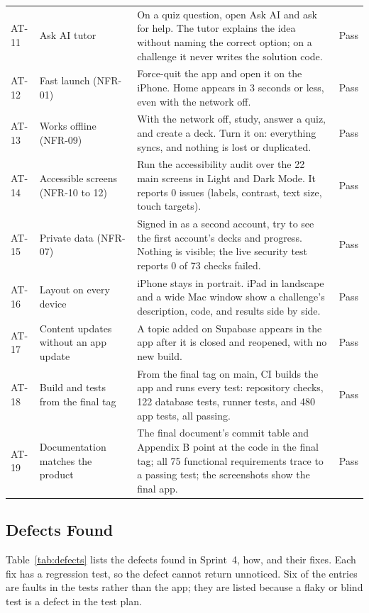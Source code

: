 \documentclass[12pt,letterpaper]{article}
\begin{document}
\begin{xltabular}{\textwidth}{@{}L{1.0cm} L{3.0cm} Y L{2.0cm}@{}}
AT-11 & Ask AI tutor & On a quiz question, open Ask AI and ask for help. The tutor explains the idea without naming the correct option; on a challenge it never writes the solution code. & Pass \\
AT-12 & Fast launch (NFR-01) & Force-quit the app and open it on the iPhone. Home appears in 3 seconds or less, even with the network off. & Pass \\
AT-13 & Works offline (NFR-09) & With the network off, study, answer a quiz, and create a deck. Turn it on: everything syncs, and nothing is lost or duplicated. & Pass \\
AT-14 & Accessible screens (NFR-10 to 12) & Run the accessibility audit over the 22 main screens in Light and Dark Mode. It reports 0 issues (labels, contrast, text size, touch targets). & Pass \\
AT-15 & Private data (NFR-07) & Signed in as a second account, try to see the first account's decks and progress. Nothing is visible; the live security test reports 0 of 73 checks failed. & Pass \\
AT-16 & Layout on every device & iPhone stays in portrait. iPad in landscape and a wide Mac window show a challenge's description, code, and results side by side. & Pass \\
AT-17 & Content updates without an app update & A topic added on Supabase appears in the app after it is closed and reopened, with no new build. & Pass \\
AT-18 & Build and tests from the final tag & From the final tag on main, CI builds the app and runs every test: repository checks, 122 database tests, runner tests, and 480 app tests, all passing. & Pass \\
AT-19 & Documentation matches the product & The final document's commit table and Appendix B point at the code in the final tag; all 75 functional requirements trace to a passing test; the screenshots show the final app. & Pass \\
\end{xltabular}

\subsection{Defects Found}\label{sec:defects}
Table~\ref{tab:defects} lists the defects found in Sprint~4, how, and their fixes.
Each fix has a regression test, so the defect cannot return unnoticed. Six of the
entries are faults in the tests rather than the app; they are listed because a flaky
or blind test is a defect in the test plan.
\end{document}
